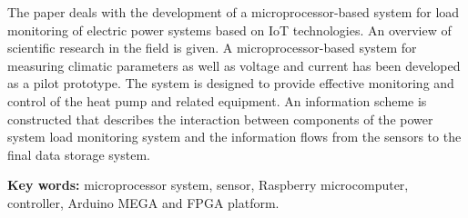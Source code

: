 The paper deals with the development of a microprocessor-based system
for load monitoring of electric power systems based on IoT technologies.
An overview of scientific research in the field is given. A
microprocessor-based system for measuring climatic parameters as well as
voltage and current has been developed as a pilot prototype. The system
is designed to provide effective monitoring and control of the heat pump
and related equipment. An information scheme is constructed that
describes the interaction between components of the power system load
monitoring system and the information flows from the sensors to the
final data storage system.

{\bfseries Key words:} microprocessor system, sensor, Raspberry
microcomputer, controller, Arduino MEGA and FPGA platform.



